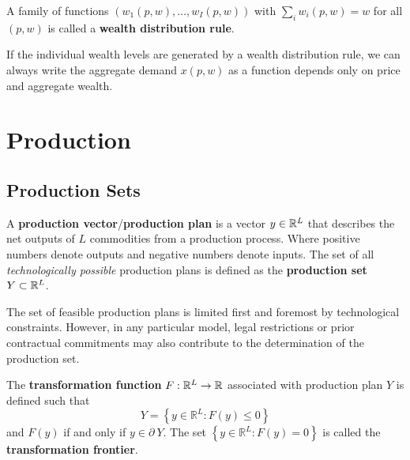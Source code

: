 \documentclass{article}
\begin{document}
	 		\begin{definition}
	 			A family of functions $(w_1(p, w), \dots, w_I(p, w))$ with $\sum_i w_i(p, w) = w$ for all $(p, w)$ is called a \textbf{wealth distribution rule}.
	 		\end{definition}
	 		
	 		\begin{proposition}
	 			If the individual wealth levels are generated by a wealth distribution rule, we can always write the aggregate demand $x(p, w)$ as a function depends only on price and aggregate wealth.
	 		\end{proposition}
	 
	 \section{Production}
	 	\subsection{Production Sets}
	 		\begin{definition}
	 			A \textbf{production vector}/\textbf{production plan} is a vector $y \in \mathbb{R}^L$ that describes the net outputs of $L$ commodities from a production process. Where positive numbers denote outputs and negative numbers denote inputs. The set of all \emph{technologically possible} production plans is defined as the \textbf{production set} $Y \subset \mathbb{R}^L$.
	 		\end{definition}
	 		
	 		\begin{remark}
	 			The set of feasible production plans is limited first and foremost by technological constraints. However, in any particular model, legal restrictions or prior contractual commitments may also contribute to the determination of the production set.
	 		\end{remark}
	 		
	 		\begin{definition}
	 			The \textbf{transformation function} $F: \mathbb{R}^L \to \mathbb{R}$ associated with production plan $Y$ is defined such that
	 			\begin{equation}
	 				Y=\left\{y \in \mathbb{R}^{L} : F(y) \leq 0\right\}
	 			\end{equation}
	 			and $F(y)$ if and only if $y \in \partial\ Y$. The set $\left\{y \in \mathbb{R}^{L} : F(y)=0\right\}$ is called the \textbf{transformation frontier}.
	 		\end{definition}
	 		
\end{document}
